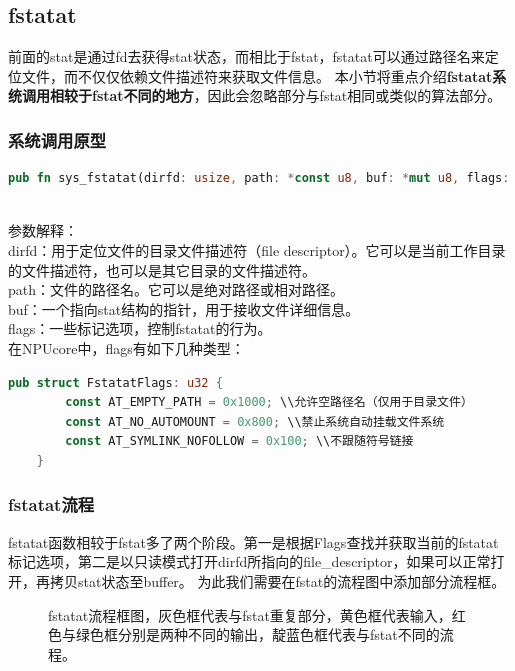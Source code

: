 \subsection{fstatat}
前面的stat是通过fd去获得stat状态，而相比于fstat，fstatat可以通过路径名来定位文件，而不仅仅依赖文件描述符来获取文件信息。
本小节将重点介绍\textbf{fstatat系统调用相较于fstat不同的地方}，因此会忽略部分与fstat相同或类似的算法部分。

\subsubsection{系统调用原型}
\begin{lstlisting}[language={Rust},
	caption={os/src/syscall/fs.rs}]
    pub fn sys_fstatat(dirfd: usize, path: *const u8, buf: *mut u8, flags: u32);
\end{lstlisting}
\\
参数解释：\\
dirfd：用于定位文件的目录文件描述符（file descriptor）。它可以是当前工作目录的文件描述符，也可以是其它目录的文件描述符。\\
path：文件的路径名。它可以是绝对路径或相对路径。\\
buf：一个指向stat结构的指针，用于接收文件详细信息。\\
flags：一些标记选项，控制fstatat的行为。\\
在NPUcore中，flags有如下几种类型：
\begin{lstlisting}[language={Rust},
	caption={NPUcore中的fstatat~flags选项}]
pub struct FstatatFlags: u32 {
        const AT_EMPTY_PATH = 0x1000; \\允许空路径名（仅用于目录文件）
        const AT_NO_AUTOMOUNT = 0x800; \\禁止系统自动挂载文件系统
        const AT_SYMLINK_NOFOLLOW = 0x100; \\不跟随符号链接
    }
\end{lstlisting}
\subsubsection{fstatat流程}
fstatat函数相较于fstat多了两个阶段。第一是根据Flags查找并获取当前的fstatat标记选项，第二是以只读模式打开dirfd所指向的file_descriptor，如果可以正常打开，再拷贝stat状态至buffer。
为此我们需要在fstat的流程图中添加部分流程框。
\begin{figure}[H]
    \centering
    \caption{fstatat流程框图，灰色框代表与fstat重复部分，黄色框代表输入，红色与绿色框分别是两种不同的输出，靛蓝色框代表与fstat不同的流程。}
\end{figure}
